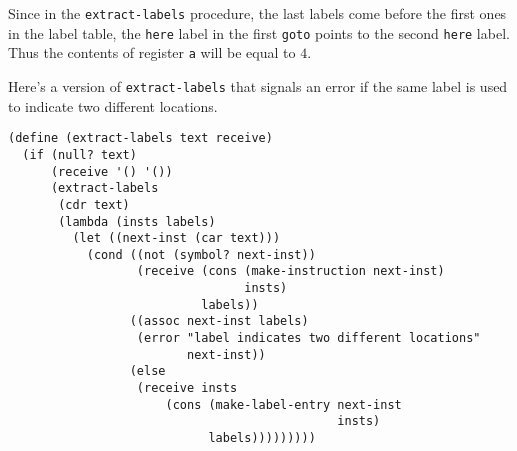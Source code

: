 \documentclass[a4paper,12pt]{article}
\begin{document}
Since in the \lstinline!extract-labels! procedure, the last labels
come before the first ones in the label table, the \lstinline!here!
label in the first \lstinline!goto! points to the second
\lstinline!here! label.  Thus the contents of register \lstinline!a!
will be equal to $4$.

Here's a version of \lstinline!extract-labels! that signals an error
if the same label is used  to indicate two different locations.

\begin{lstlisting}
(define (extract-labels text receive)
  (if (null? text)
      (receive '() '())
      (extract-labels
       (cdr text)
       (lambda (insts labels)
         (let ((next-inst (car text)))
           (cond ((not (symbol? next-inst))
                  (receive (cons (make-instruction next-inst)
                                 insts)
                           labels))
                 ((assoc next-inst labels)
                  (error "label indicates two different locations"
                         next-inst))
                 (else
                  (receive insts
                      (cons (make-label-entry next-inst
                                              insts)
                            labels)))))))))
\end{lstlisting}
\end{document}

